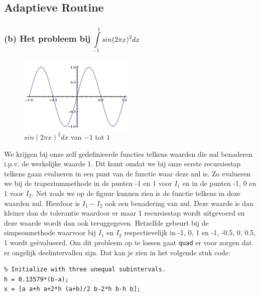 \documentclass[11pt,a4paper]{article}
\begin{document}
\subsection{Adaptieve Routine}

\subsubsection*{(b) Het probleem bij $\mathop{\mathlarger{\int\limits_{-1}^1sin(2\pi x)^2dx}}$}

\begin{figure}
	\begin{center}
	\vspace{-85pt}
	\includegraphics[width=0.5\textwidth]{12b.png}
	\caption*{$sin(2\pi x)^2dx$ van $-1$ tot $1$}
	\vspace{-25pt}
	\end{center}
	\end{figure}
We krijgen bij onze zelf gedefinieerde functies telkens waarden die nul benaderen i.p.v. de werkelijke waarde 1. Dit komt omdat we bij onze eerste recursiestap telkens gaan evalueren in een punt van de functie waar deze nul is. Zo evalueren we bij de trapeziummethode in de punten -1 en 1 voor $I_1$ en in de punten -1, 0 en 1 voor $I_2$. Net zoals we op de figuur kunnen zien is de functie telkens in deze waarden nul. Hierdoor is $I_1 - I_2$ ook een benadering van nul. Deze waarde is dan kleiner dan de tolerantie waardoor er maar 1 recursiestap wordt uitgevoerd en deze waarde wordt dan ook teruggegeven. Hetzelfde gebeurt bij de simpsonmethode waarvoor bij $I_1$ en $I_2$ respectievelijk in -1, 0, 1 en -1, -0.5, 0, 0.5, 1 wordt ge\"evalueerd. Om dit probleem op te lossen gaat \verb|quad| er voor zorgen dat er ongelijk deelintervallen zijn. Dat kan je zien in het volgende stuk code:
\begin{verbatim}
% Initialize with three unequal subintervals.
h = 0.13579*(b-a);
x = [a a+h a+2*h (a+b)/2 b-2*h b-h b];
\end{verbatim}
\end{document}
